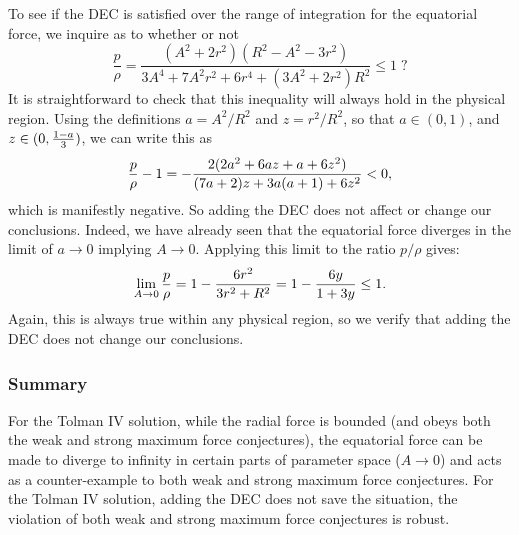 \documentclass[12pt]{article}
\begin{document}
To see if the DEC is satisfied over the range of integration for the equatorial force, we inquire as to whether or not
%
\begin{equation}
    \frac{p}{\rho} =
\frac{(A^2 + 2r^2)(R^2 - A^2 - 3r^2)}{3A^4 + 7A^2r^2 + 6r^4 + (3A^2 + 2r^2)R^2} \leq1\;?
\end{equation}
%
It is straightforward to check that this inequality will always hold in the physical region.
Using the definitions $a=A^2/R^2$ and $z=r^2/R^2$, so that $a\in(0,1)$, 
and $z\in(0,{1-a\over3})$, we can write this as
\begin{equation}
{p\over\rho}-1 = 
-{2(2a^2+6az+a+6z^2)\over(7a+2)z +3a(a+1) +6z^2} 
<0,
\end{equation}
which is manifestly negative. 
So adding the DEC does not affect or change our conclusions.
Indeed, we have already seen that the equatorial force diverges in the limit of $a\to0$ implying $A\rightarrow 0$. Applying this limit to the ratio $p/\rho$ gives:
%
\begin{equation}
    \lim_{A \rightarrow 0 } \frac{p}{\rho} = 1 - \frac{6r^2}{3r^2+R^2}= 1 - {6y\over1+3y} \leq 1.
\end{equation}
%
Again, this is always true within any physical region,
so we verify that adding the DEC does not change our conclusions.

\subsubsection{Summary}

For the Tolman IV solution, while the radial force is bounded (and  obeys both the weak and strong maximum force conjectures), the equatorial force can be made to diverge to infinity in certain parts of parameter space ($A\to0$) and acts as a counter-example to both weak and strong maximum force conjectures. For the Tolman IV solution, adding the DEC does not save the situation, the violation of both weak and strong  maximum force conjectures is robust.

\end{document}
